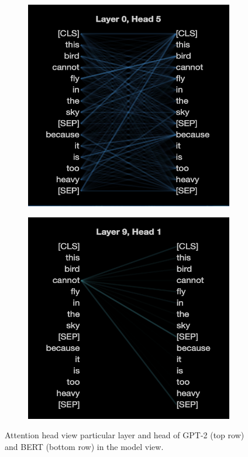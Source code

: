\documentclass[]{article}
\begin{document}
\begin{figure}[!h]
\begin{subfigure}[b]{0.32\textwidth}
    \end{subfigure}
    \hfill
    \begin{subfigure}[b]{0.32\textwidth}
        \includegraphics[width=\textwidth]{FIGS/bert_model_L0H5.png}
    \end{subfigure}
    \hfill
        \begin{subfigure}[b]{0.32\textwidth}
            \includegraphics[width=\textwidth]{FIGS/bert_model_L9H1.png}
    \end{subfigure}
    \caption{Attention head view particular layer and head of GPT-2 (top row) and BERT (bottom row) in the model view.}
    \label{fig:model_view_detail}
\end{figure}
\end{document}
